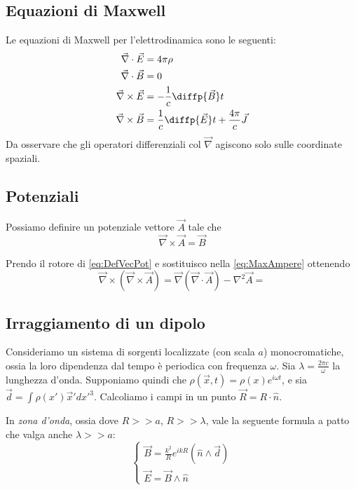 \documentclass[a4paper,10pt,oneside]{math_article}
\newcommand{\rot}{\vec{\nabla} \times}
\renewcommand{\div}{\vec{\nabla} \cdot}
\newcommand{\grad}{\vec{\nabla}}
\newcommand{\lapl}{{\nabla}^2}
\begin{document}
		\subsection{Equazioni di Maxwell}
			Le equazioni di Maxwell per l'elettrodinamica sono le seguenti:
			\begin{align}\displaystyle
				\div \vec E &= 4\pi \rho \label{eq:MaxGauss}\\ 
				\div \vec B &= 0 \label{eq:MaxMonopole} \\
				\rot \vec E &= -\frac1c \diffp {\vec B}t \label{eq:MaxFaraday}\\
				\rot \vec B &= \dfrac1c \diffp {\vec E}t + \dfrac{4\pi}c \vec J \label{eq:MaxAmpere}
			\end{align}
			Da osservare che gli operatori differenziali col $\vec \nabla$ agiscono solo sulle coordinate spaziali.
		\subsection{Potenziali}
			Possiamo definire un potenziale vettore $\vec A$ tale che
			\begin{equation}\label{eq:DefVecPot}
			 \rot \vec A = \vec B
			\end{equation}

			Prendo il rotore di \ref{eq:DefVecPot} e sostituisco nella \ref{eq:MaxAmpere} ottenendo
			\begin{equation}
				\rot (\rot \vec A) = \grad(\div \vec A) - \lapl \vec A = 
			\end{equation}
			
		\subsection{Irraggiamento di un dipolo}
			Consideriamo un sistema di sorgenti localizzate (con scala $a$) monocromatiche, ossia la loro dipendenza dal tempo è periodica con frequenza $\omega$. Sia $\lambda=\frac{2\pi c}{\omega}$ la lunghezza d'onda.
			Supponiamo quindi che $\rho(\vec x, t) = \rho(x)e^{i\omega t}$, e sia $\vec d= \int \rho(x')\vec x' dx'^3$. Calcoliamo i campi in un punto $\vec R = R\cdot \hat n$.
			
			In \emph{zona d'onda}, ossia dove $R >> a$, $R >> \lambda$, vale la seguente formula a patto che valga anche $\lambda >> a$:
			\begin{equation}
				\begin{cases}
					\vec B = \frac{k^2}{R} e^{ikR} (\hat n \wedge \vec d)\\
					\vec E = \vec B \wedge \hat n
				\end{cases}
			\end{equation}
			
\end{document}
